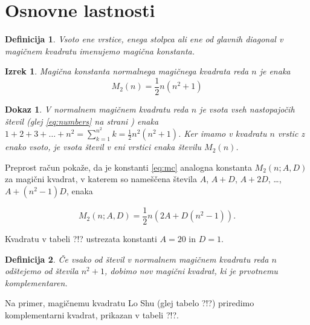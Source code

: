\documentclass[a4paper,12pt]{article}
\newtheorem{definicija}{Definicija}}
\newtheorem{izrek}{Izrek}
\newtheorem{dokaz}{Dokaz}}
\begin{document}

\section{Osnovne lastnosti}

\begin{definicija}
      Vsoto ene vrstice, enega stolpca ali ene od glavnih diagonal
      v magičnem kvadratu imenujemo \emph{magična konstanta}.
\end{definicija}

\begin{izrek}
   Magična konstanta normalnega magičnega kvadrata reda $n$
   je enaka
   \begin{equation}
      \label{eq:mc}
      M_2(n) = \frac{1}{2} n(n^2+1)
   \end{equation}
\end{izrek}

\begin{dokaz}
   V normalnem magičnem kvadratu reda $n$ je vsota vseh nastopajočih
   števil (glej \eqref{eq:numbers} na strani \pageref{eq:numbers}) enaka
   $1+2+3+\dots+n^2=\sum_{k=1}^{n^2}k=\frac{1}{2}n^2(n^2+1)$. Ker imamo
   v kvadratu $n$ vrstic z enako vsoto, je vsota števil v eni vrstici
   enaka številu $M_2(n)$. %
\end{dokaz}

Preprost račun pokaže, da je konstanti \eqref{eq:mc} analogna konstanta
$M_2(n;A,D)$ za magični kvadrat, v katerem so nameščena števila
$A$, $A+D$, $A+2D$, \dots, $A+(n^2-1)D$, enaka %

$$M_2(n;A,D) = \frac{1}{2}n(2A + D(n^2 - 1)).$$

Kvadratu v tabeli ?!? ustrezata konstanti $A=20$ in $D=1$.

\begin{definicija}
      Če vsako od števil v normalnem magičnem kvadratu reda $n$ odštejemo
      od števila $n^2+1$, dobimo nov magični kvadrat, ki je prvotnemu
      \emph{komplementaren}.
\end{definicija}

Na primer, magičnemu kvadratu Lo Shu (glej tabelo ?!?) priredimo
komplementarni kvadrat, prikazan v tabeli ?!?.
%
\end{document}
